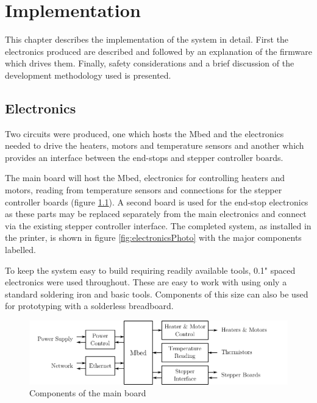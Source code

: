 \chapter{Implementation}
	
	\label{sec:implementation}
	
	This chapter describes the implementation of the system in detail. First the
	electronics produced are described and followed by an explanation of the
	firmware which drives them. Finally, safety considerations and a brief
	discussion of the development methodology used is presented.
	
	\section{Electronics}
		
		Two circuits were produced, one which hosts the Mbed and the electronics
		needed to drive the heaters, motors and temperature sensors and another
		which provides an interface between the end-stops and stepper controller
		boards.
		
		The main board will host the Mbed, electronics for controlling heaters and
		motors, reading from temperature sensors and connections for the stepper
		controller boards (figure \ref{fig:electronicsDiagram}). A second board is
		used for the end-stop electronics as these parts may be replaced separately
		from the main electronics and connect via the existing stepper controller
		interface. The completed system, as installed in the printer, is shown in
		figure \ref{fig:electronicsPhoto} with the major components labelled.
		
		To keep the system easy to build requiring readily available tools, 0.1"
		spaced electronics were used throughout. These are easy to work with using
		only a standard soldering iron and basic tools. Components of this size can
		also be used for prototyping with a solderless breadboard.
		
		\begin{figure}
			\includegraphics[width=1\textwidth]{diagrams/electronicsDiagram.pdf}
			\caption{Components of the main board}
			\label{fig:electronicsDiagram}
		\end{figure}
		

